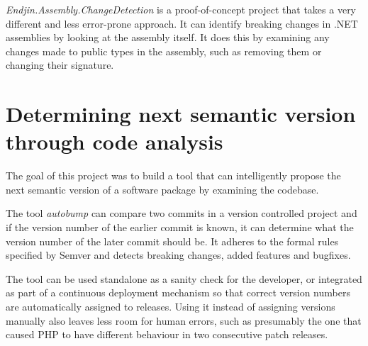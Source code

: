 \documentclass{l4proj}
\begin{document}
\textit{Endjin.Assembly.ChangeDetection}\cite{Endjin} is a
proof-of-concept project that takes a very different and less
error-prone approach. It can identify breaking changes in .NET
assemblies by looking at the assembly itself. It does this
by examining any changes made to public types in the assembly, such as
removing them or changing their signature.


\section{Determining next semantic version through code analysis}


The goal of this project was to build a tool that can intelligently propose
the next semantic version of a software package by examining the codebase.

The tool \textit{autobump} can compare two commits in a version controlled
project and if the version number of the earlier commit is known, it can determine
what the version number of the later commit should be. It adheres to the formal
rules specified by Semver\cite{SemanticVersioning} and detects breaking changes,
added features and bugfixes.


The tool can be used standalone as a sanity check for the developer, or integrated
as part of a continuous deployment mechanism so that correct version numbers are
automatically assigned to releases. Using it instead of assigning versions manually
also leaves less room for human errors, such as presumably the one that caused PHP
to have different behaviour in two consecutive patch releases.




\end{document}
